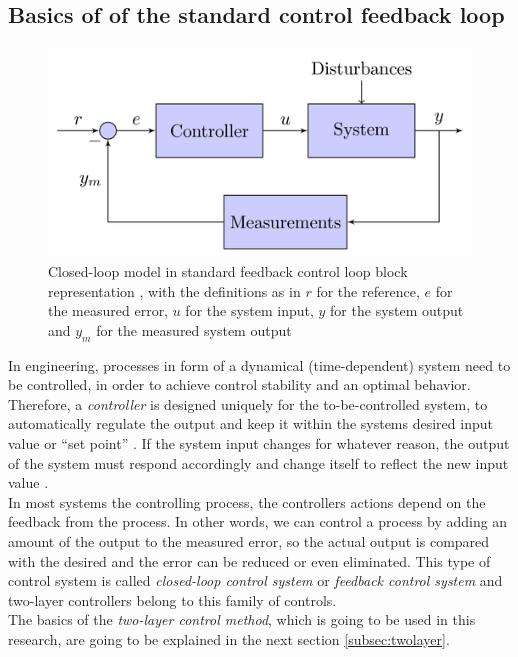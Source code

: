 \subsection{Basics of of the standard control feedback loop}
\label{subsec:feedback}
\begin{figure}[h]
\centering
    \includegraphics[scale=0.5]{pictures/control-system-principles.png}
    \caption{Closed-loop model in standard feedback control loop block representation \cite{cs_princi}, with the definitions as in \cite{cs_princi_wiki,lia_master} $r$ for the reference, $e$ for the measured error, $u$ for the system input, $y$ for the system output and $y_m$ for the measured system output}
    \label{clm_standard_feed}
\end{figure}
In engineering, processes in form of a dynamical (time-dependent) system need to be controlled, in order to achieve control stability and an optimal behavior. Therefore, a \textit{controller} is designed uniquely for the to-be-controlled system, to automatically regulate the output and keep it within the systems desired input value or “set point” \cite{oploop}. If the system input changes for whatever reason, the output of the system must respond accordingly and change itself to reflect the new input value \cite{oploop}. 
\\In most systems the controlling process, the controllers actions depend on the feedback from the process. In other words, we can control a process by adding an amount of the output to the measured error, so the actual output is compared with the desired and the error can be reduced or even eliminated. 
This type of control system is called \textit{closed-loop control system} or \textit{feedback control system} and two-layer controllers belong to this family of controls. \\The basics of the \textit{two-layer control method}, which is going to be used in this research, are going to be explained in the next section \ref{subsec:twolayer}.
